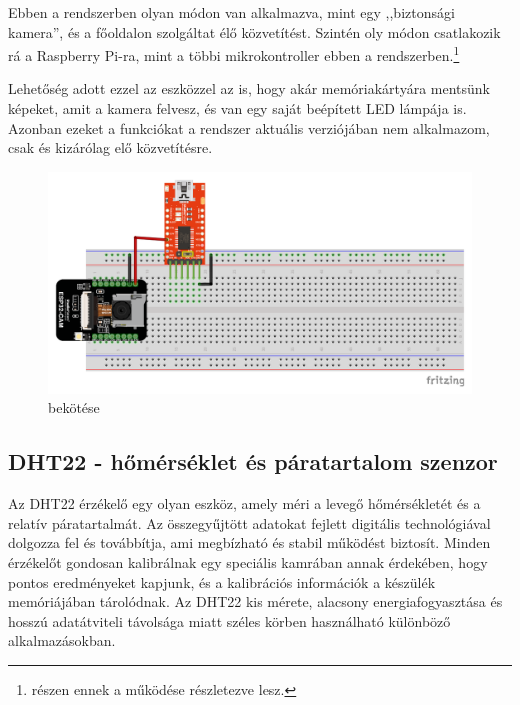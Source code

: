 \documentclass[
]{thesis-ekf}
\theoremstyle{definition}
\theoremstyle{remark}
\begin{document}
	Ebben a rendszerben olyan módon van alkalmazva, mint egy ,,biztonsági kamera'', és a főoldalon szolgáltat élő közvetítést. Szintén oly módon csatlakozik rá a Raspberry Pi-ra, mint a többi mikrokontroller ebben a rendszerben.\footnote{\label{later-expl-fn} részen ennek a működése részletezve lesz.}
	
	Lehetőség adott ezzel az eszközzel az is, hogy akár memóriakártyára mentsünk képeket, amit a kamera felvesz, és van egy saját beépített LED lámpája is. Azonban ezeket a funkciókat a rendszer aktuális verziójában nem alkalmazom, csak és kizárólag elő közvetítésre.
	
	\begin{figure}[ht!]
		\centering
		\includegraphics[width=16cm]{./img/ESP32 CAM schematics}
		\caption{ bekötése}
		\label{esp32-cam-schematics}
	\end{figure}	
	
	\subsection{DHT22 - hőmérséklet és páratartalom szenzor}
	
	Az DHT22 érzékelő egy olyan eszköz, amely méri a levegő hőmérsékletét és a relatív  páratartalmát. Az összegyűjtött adatokat fejlett digitális technológiával dolgozza fel és továbbítja, ami megbízható és stabil működést biztosít. Minden érzékelőt gondosan kalibrálnak egy speciális kamrában annak érdekében, hogy pontos eredményeket kapjunk, és a kalibrációs információk a készülék memóriájában tárolódnak. Az DHT22 kis mérete, alacsony energiafogyasztása és hosszú adatátviteli távolsága miatt széles körben használható különböző alkalmazásokban.\cite{dht22}
	
\end{document}
